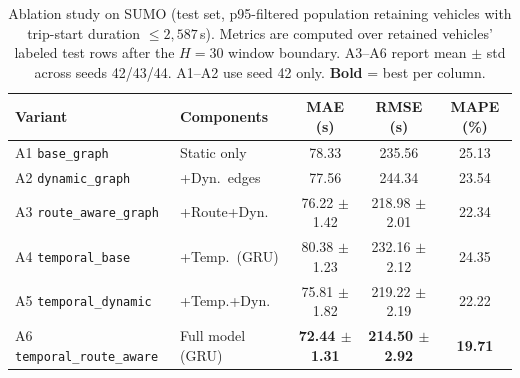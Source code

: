 \begin{table}[t]
    \centering
    \caption{Ablation study on SUMO (test set, p95-filtered population retaining vehicles with trip-start duration $\leq 2{,}587$\,s). Metrics are computed over retained vehicles' labeled test rows after the $H{=}30$ window boundary. A3--A6 report mean $\pm$ std across seeds 42/43/44. A1--A2 use seed 42 only. \textbf{Bold} = best per column.}
    \label{tab:ablation_sumo_p95}
    {\footnotesize\setlength{\tabcolsep}{4pt}%
    \begin{tabular}{@{}llccc@{}}
        \toprule
        \textbf{Variant} & \textbf{Components} & \textbf{MAE (s)} & \textbf{RMSE (s)} & \textbf{MAPE (\%)} \\
        \midrule
        A1 \texttt{base\_graph}            & Static only         & 78.33 & 235.56 & 25.13 \\
        A2 \texttt{dynamic\_graph}         & +Dyn.\ edges        & 77.56 & 244.34 & 23.54 \\
        A3 \texttt{route\_aware\_graph}    & +Route+Dyn.\        & 76.22 $\pm$ 1.42 & 218.98 $\pm$ 2.01 & 22.34 \\
        A4 \texttt{temporal\_base}         & +Temp.\ (GRU)       & 80.38 $\pm$ 1.23 & 232.16 $\pm$ 2.12 & 24.35 \\
        A5 \texttt{temporal\_dynamic}      & +Temp.+Dyn.\        & 75.81 $\pm$ 1.82 & 219.22 $\pm$ 2.19 & 22.22 \\
        A6 \texttt{temporal\_route\_aware} & Full model (GRU)    & \textbf{72.44 $\pm$ 1.31} & \textbf{214.50 $\pm$ 2.92} & \textbf{19.71} \\
        \bottomrule
    \end{tabular}}%
\end{table}

